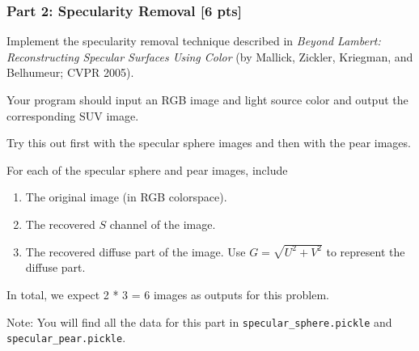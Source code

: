 \documentclass[11pt]{article}
\begin{document}
    \hypertarget{part-2-specularity-removal-6-pts}{%
\subsubsection{Part 2: Specularity Removal {[}6
pts{]}}\label{part-2-specularity-removal-6-pts}}

Implement the specularity removal technique described in \emph{Beyond
Lambert: Reconstructing Specular Surfaces Using Color} (by Mallick,
Zickler, Kriegman, and Belhumeur; CVPR 2005).

Your program should input an RGB image and light source color and output
the corresponding SUV image.

Try this out first with the specular sphere images and then with the
pear images.

For each of the specular sphere and pear images, include

\begin{enumerate}
\def\labelenumi{\arabic{enumi}.}
\item
  The original image (in RGB colorspace).
\item
  The recovered \(S\) channel of the image.
\item
  The recovered diffuse part of the image. Use \(G = \sqrt{U^2+V^2}\) to
  represent the diffuse part.
\end{enumerate}

In total, we expect 2 * 3 = 6 images as outputs for this problem.

Note: You will find all the data for this part in
\texttt{specular\_sphere.pickle} and \texttt{specular\_pear.pickle}.
\end{document}
